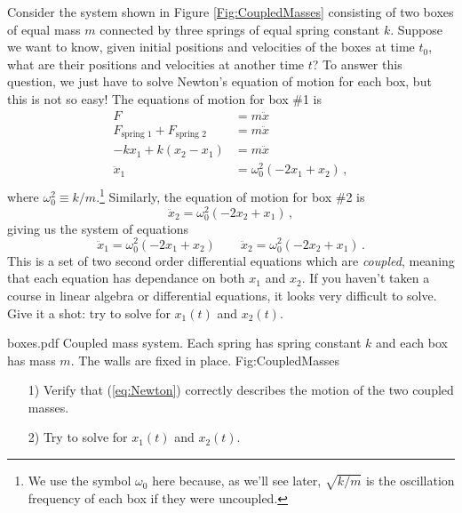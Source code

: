 Consider the system shown in Figure \ref{Fig:CoupledMasses} consisting of two boxes of equal mass $m$ connected by three springs of equal spring constant $k$.
Suppose we want to know, given initial positions and velocities of the boxes at time $t_{0}$, what are their positions and velocities at another time $t$?
To answer this question,  we just have to solve Newton's equation of motion for each box, but this is not so easy!
The equations of motion for box \#1 is
\begin{align*}
F &= m \ddot{x} \\
F_\text{spring 1} + F_\text{spring 2} &= m \ddot{x} \\
-k x_1 + k (x_2 - x_1) &= m \ddot{x} \\
\ddot{x}_1 &= \omega_0^2 (-2 x_1 + x_2) \, , \\
\end{align*}
where $\omega_0^2 \equiv k/m$.\footnote{We use the symbol $\omega_0$ here because, as we'll see later, $\sqrt{k/m}$ is the oscillation frequency of each box if they were uncoupled.}
Similarly, the equation of motion for box \#2 is
\begin{equation*}
\ddot{x}_2 = \omega_0^2 (-2 x_2 + x_1) \, ,
\end{equation*}
giving us the system of equations
\begin{equation} \label{eq:Newton}
\ddot{x}_{1} = \omega_{0}^{2} (-2x_{1} + x_{2}) \qquad
\ddot{x}_{2} = \omega_{0}^{2} (-2x_{2} + x_{1}) \, .
\end{equation}
This is a set of two second order differential equations which are \textit{coupled}, meaning that each equation has dependance on both $x_1$ and $x_2$.
If you haven't taken a course in linear algebra or differential equations, it looks very difficult to solve.
Give it a shot: try to solve for $x_{1}(t)$ and $x_{2}(t)$.

\quickfig
{\columnwidth}
{boxes.pdf}
{Coupled mass system.
Each spring has spring constant $k$ and each box has mass $m$.
The walls are fixed in place.}
{Fig:CoupledMasses}


\begin{itemize}\item[1)] Verify that (\ref{eq:Newton}) correctly describes the motion of the two coupled masses.\item[2)] Try to solve for $x_{1}(t)$ and $x_{2}(t)$.\end{itemize}

